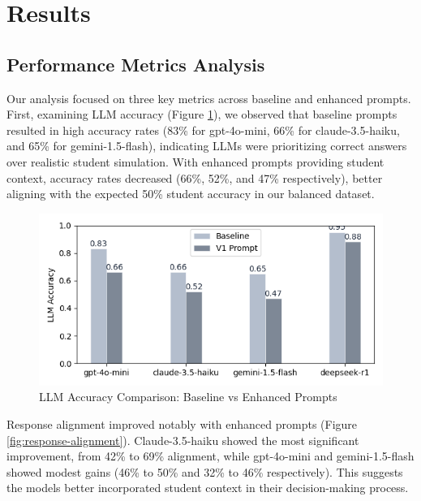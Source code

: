 \documentclass[
    a4paper, %
    10pt, %
    twoside, %
]{LTJournalArticle}
\begin{document}
\section{Results}

\subsection{Performance Metrics Analysis}
Our analysis focused on three key metrics across baseline and enhanced prompts. First, examining LLM accuracy (Figure \ref{fig:llm-accuracy}), we observed that baseline prompts resulted in high accuracy rates (83\% for gpt-4o-mini, 66\% for claude-3.5-haiku, and 65\% for gemini-1.5-flash), indicating LLMs were prioritizing correct answers over realistic student simulation. With enhanced prompts providing student context, accuracy rates decreased (66\%, 52\%, and 47\% respectively), better aligning with the expected 50\% student accuracy in our balanced dataset.
\begin{figure}[H]
    \centering
    \includegraphics[width=\columnwidth]{images/llm_accuracy_comparison.png}
    \caption{LLM Accuracy Comparison: Baseline vs Enhanced Prompts}
    \label{fig:llm-accuracy}
\end{figure}

Response alignment improved notably with enhanced prompts (Figure \ref{fig:response-alignment}). Claude-3.5-haiku showed the most significant improvement, from 42\% to 69\% alignment, while gpt-4o-mini and gemini-1.5-flash showed modest gains (46\% to 50\% and 32\% to 46\% respectively). This suggests the models better incorporated student context in their decision-making process.
\end{document}
